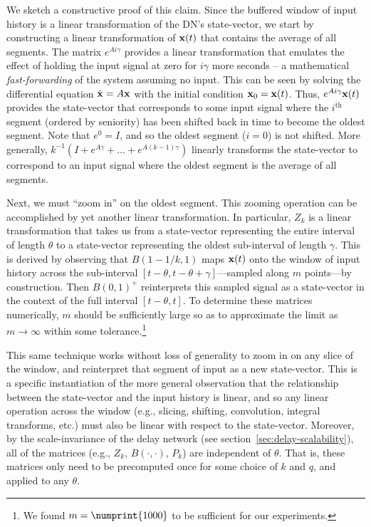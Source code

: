 We sketch a constructive proof of this claim.
Since the buffered window of input history is a linear transformation of the DN's state-vector, we start by constructing a linear transformation of $\mathbf{x}(t)$ that contains the average of all segments. 
The matrix $e^{A i \gamma}$ provides a linear transformation that emulates the effect of holding the input signal at zero for $i \gamma$ more seconds -- a mathematical \emph{fast-forwarding} of the system assuming no input.
This can be seen by solving the differential equation $\dot{\mathbf{x}} = A \mathbf{x}$ with the initial condition $\mathbf{x}_0 = \mathbf{x}(t)$.
Thus, $e^{A i \gamma} \mathbf{x}(t)$ provides the state-vector that corresponds to some input signal where the $i^\text{th}$ segment (ordered by seniority) has been shifted back in time to become the oldest segment. 
Note that $e^0 = I$, and so the oldest segment ($i=0$) is not shifted.
More generally, $k^{-1} \left( I + e^{A \gamma} + \ldots + e^{A (k-1) \gamma} \right)$ linearly transforms the state-vector to correspond to an input signal where the oldest segment is the average of all segments.

Next, we must ``zoom in'' on the oldest segment.  
This zooming operation can be accomplished by yet another linear transformation.
In particular, $Z_k$ is a linear transformation that takes us from a state-vector representing the entire interval of length $\theta$ to a state-vector representing the oldest sub-interval of length $\gamma$.
This is derived by observing that $B(1 - 1/k, 1)$ maps $\mathbf{x}(t)$ onto the window of input history across the sub-interval $[t - \theta, t - \theta + \gamma]$---sampled along $m$ points---by construction.
Then $B(0, 1)^+$ reinterprets this sampled signal as a state-vector in the context of the full interval $[t - \theta, t]$.
To determine these matrices numerically, $m$ should be sufficiently large so as to approximate the limit as $m \rightarrow \infty$ within some tolerance.\footnote{%
We found $m = \numprint{1000}$ to be sufficient for our experiments.}

This same technique works without loss of generality to zoom in on any slice of the window, and reinterpret that segment of input as a new state-vector. This is a specific instantiation of the more general observation that the relationship between the state-vector and the input history is linear, and so any linear operation across the window (e.g., slicing, shifting, convolution, integral transforms, etc.) must also be linear with respect to the state-vector.
Moreover, by the scale-invariance of the delay network (see section~\ref{sec:delay-scalability}), all of the matrices (e.g., $Z_k$, $B(\cdot, \cdot)$, $P_k$) are independent of $\theta$. That is, these matrices only need to be precomputed once for some choice of $k$ and $q$, and applied to any $\theta$.

